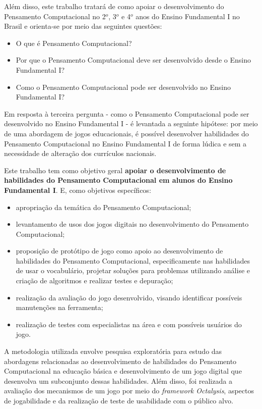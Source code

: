 Além disso, este trabalho tratará de como apoiar o desenvolvimento do Pensamento Computacional no 2$^o$, 3$^o$ e 4$^o$ anos do Ensino Fundamental I no Brasil e orienta-se por meio das seguintes questões: 

\begin{itemize}
\item O que é Pensamento Computacional?
\item Por que o Pensamento Computacional deve ser desenvolvido desde o Ensino Fundamental I?
\item Como o Pensamento Computacional pode ser desenvolvido no Ensino Fundamental I?
\end{itemize}

Em resposta à terceira pergunta - como o Pensamento Computacional pode ser desenvolvido no Ensino Fundamental I - é levantada a seguinte hipótese: por meio de uma abordagem de jogos educacionais, é possível desenvolver habilidades do Pensamento Computacional no Ensino Fundamental I de forma lúdica e sem a necessidade de alteração dos currículos nacionais.

Este trabalho tem como objetivo geral \textbf{apoiar o desenvolvimento de habilidades do Pensamento Computacional em alunos do Ensino Fundamental I}. E, como objetivos específicos:

\begin{itemize}
	\item apropriação da temática do Pensamento Computacional;
	\item levantamento de usos dos jogos digitais no desenvolvimento do Pensamento Computacional;
	\item proposição de protótipo de jogo como apoio ao desenvolvimento de habilidades do Pensamento Computacional, especificamente nas habilidades de usar o vocabulário, projetar soluções para problemas utilizando análise e criação de algoritmos e realizar testes e depuração;
	\item realização da avaliação do jogo desenvolvido, visando identificar possíveis manutenções na ferramenta;
	\item realização de testes com especialistas na área e com possíveis usuários do jogo.
\end{itemize}

A metodologia utilizada envolve pesquisa exploratória para estudo das abordagens relacionadas ao desenvolvimento de habilidades do Pensamento Computacional na educação básica e desenvolvimento de um jogo digital que desenvolva um subconjunto dessas habilidades. Além disso, foi realizada a avaliação dos mecanismos de um jogo por meio do \textit{framework Octalysis}, aspectos de jogabilidade e da realização de teste de usabilidade com o público alvo.

